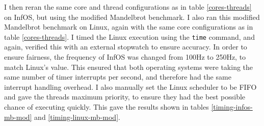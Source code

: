 \documentclass[bsc,frontabs,twoside,singlespacing,parskip,deptreport]{infthesis}     %
\begin{document}
I then reran the same core and thread configurations as in table \ref{cores-threads} on InfOS, but using the modified Mandelbrot benchmark. I also ran this modified Mandelbrot benchmark on Linux, again with the same core configurations as in table \ref{cores-threads}. I timed the Linux execution using the \verb|time| command, and again, verified this with an external stopwatch to ensure accuracy. In order to ensure fairness, the frequency of InfOS was changed from 100Hz to 250Hz, to match Linux's value. This ensured that both operating systems were taking the same number of timer interrupts per second, and therefore had the same interrupt handling overhead. I also manually set the Linux scheduler to be FIFO and gave the threads maximum priority, to ensure they had the best possible chance of executing quickly. This gave the results shown in tables \ref{timing-infos-mb-mod} and \ref{timing-linux-mb-mod}.
\end{document}
